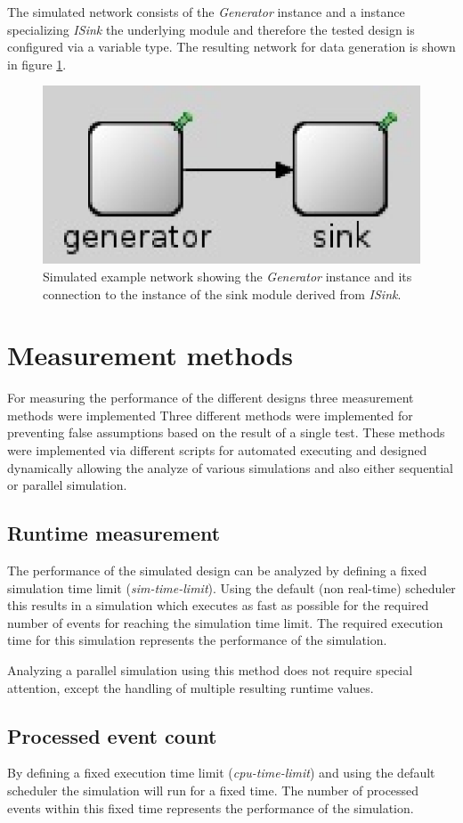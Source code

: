 The simulated network consists of the \emph{Generator} instance and a instance specializing \emph{ISink} the underlying module and therefore the tested design is configured via a variable type.
The resulting network for data generation is shown in figure \ref{fig:omnet_example_network}.

\begin{figure}
    \centering
    \includegraphics[width=0.3\linewidth]{images/omnet_example_network}
    \caption{Simulated example network showing the \emph{Generator} instance and its connection to the instance of the sink module derived from \emph{ISink}.}
    \label{fig:omnet_example_network}
\end{figure}

\section{Measurement methods}
\label{sec:measurements_methods}
For measuring the performance of the different designs three measurement methods were implemented
Three different methods were implemented for preventing false assumptions based on the result of a single test.
These methods were implemented via different scripts for automated executing and designed dynamically allowing the analyze of various simulations and also either sequential or parallel simulation.

\subsection{Runtime measurement}
\label{sec:measurements_methods_runtime}
The performance of the simulated design can be analyzed by defining a fixed simulation time limit (\emph{sim-time-limit}).
Using the default (non real-time) scheduler this results in a simulation which executes as fast as possible for the required number of events for reaching the simulation time limit.
The required execution time for this simulation represents the performance of the simulation.

Analyzing a parallel simulation using this method does not require special attention, except the handling of multiple resulting runtime values.

\subsection{Processed event count}
\label{sec:measurements_methods_event}
By defining a fixed execution time limit (\emph{cpu-time-limit}) and using the default scheduler the simulation will run for a fixed time.
The number of processed events within this fixed time represents the performance of the simulation.

